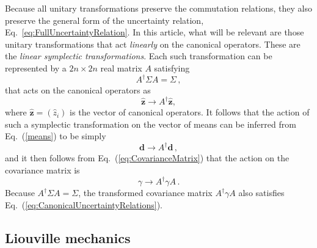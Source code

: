 \documentclass[pra,superscriptaddress,nofootinbib,12pt]{revtex4-2}
\newcommand{\mean}{d}
\begin{document}
Because all unitary transformations preserve the commutation relations, they also preserve the general form of the uncertainty relation, Eq.~\eqref{eq:FullUncertaintyRelation}.  In this article, what will be relevant are those unitary transformations that act \emph{linearly} on the canonical operators.  These are the \emph{linear symplectic transformations}.  Each such transformation can be represented by a $2n \times 2n$ real matrix $A$ satisfying
\begin{equation}
  A^\dag \Sigma A = \Sigma\,,
\end{equation}
that acts on the canonical operators as
\begin{equation}
\hat{\mathbf{z}} \rightarrow A^\dag \hat{\mathbf{z}},
\label{eq:SymplecticTrans}
\end{equation}
where $\hat{\mathbf{z}} = (\hat{z}_i)$ is the vector of canonical operators.
It follows that the action of such a symplectic transformation on the vector of means can be inferred from
Eq.~(\ref{means}) to be simply
\begin{equation}
\mathbf{\mean} \rightarrow A^\dag\mathbf{\mean} \,,
\end{equation}
and it then follows from Eq.~(\ref{eq:CovarianceMatrix}) that the action on the
covariance matrix is
\begin{equation}
\gamma \rightarrow A^{\dag}\gamma A\,.
\end{equation}
Because $A^{\dag }\Sigma A=\Sigma$, the transformed covariance matrix $A^{\dag}\gamma A$ also satisfies Eq.~(\ref{eq:CanonicalUncertaintyRelations}).

\subsection{Liouville mechanics}
\label{sec:Liouville}
\end{document}
